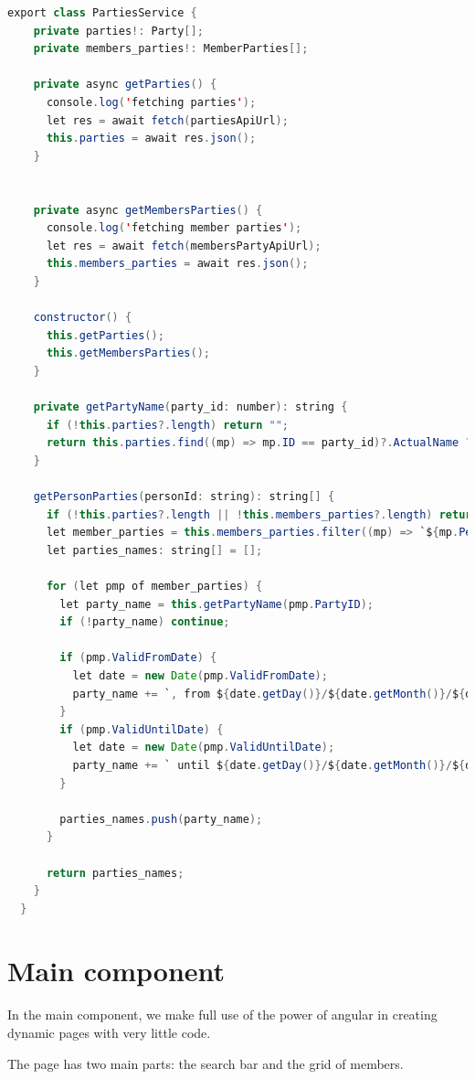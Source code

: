 \documentclass[12pt, a4paper]{article}
\begin{document}
  \begin{lstlisting}[language=java, caption={Parties API Service}]
    export class PartiesService {
    private parties!: Party[];
    private members_parties!: MemberParties[];

    private async getParties() {
      console.log('fetching parties');
      let res = await fetch(partiesApiUrl);
      this.parties = await res.json();
    }
 
    
    private async getMembersParties() {
      console.log('fetching member parties');
      let res = await fetch(membersPartyApiUrl);
      this.members_parties = await res.json();
    }

    constructor() {
      this.getParties();
      this.getMembersParties();
    }

    private getPartyName(party_id: number): string {
      if (!this.parties?.length) return "";
      return this.parties.find((mp) => mp.ID == party_id)?.ActualName ?? "";
    }

    getPersonParties(personId: string): string[] {
      if (!this.parties?.length || !this.members_parties?.length) return [];
      let member_parties = this.members_parties.filter((mp) => `${mp.PersonID}` == personId);
      let parties_names: string[] = [];
      
      for (let pmp of member_parties) {
        let party_name = this.getPartyName(pmp.PartyID);
        if (!party_name) continue;

        if (pmp.ValidFromDate) {
          let date = new Date(pmp.ValidFromDate);
          party_name += `, from ${date.getDay()}/${date.getMonth()}/${date.getFullYear()}`;
        }
        if (pmp.ValidUntilDate) {
          let date = new Date(pmp.ValidUntilDate);
          party_name += ` until ${date.getDay()}/${date.getMonth()}/${date.getFullYear()}`;
        }

        parties_names.push(party_name);
      }

      return parties_names;
    }
  }\end{lstlisting}

  \pagebreak
  \section{Main component}

  In the main component, we make full use of the power of angular in creating dynamic pages with very little code.

  The page has two main parts: the search bar and the grid of members.
\end{document}
